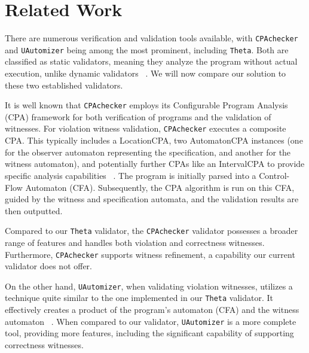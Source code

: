 \chapter{Related Work}

There are numerous verification and validation tools available, with \texttt{CPAchecker} and \texttt{UAutomizer}
being among the most prominent, including \texttt{Theta}. Both are classified as static validators, meaning
they analyze the program without actual execution, unlike dynamic validators ~\cite{witness1}. We will now compare
our solution to these two established validators.

It is well known that \texttt{CPAchecker} employs its Configurable Program Analysis (CPA) framework for
both verification of programs and the validation of witnesses. For violation witness validation, \texttt{CPAchecker}
executes a composite CPA. This typically includes a LocationCPA, two AutomatonCPA instances (one
for the observer automaton representing the specification, and another for the witness automaton),
and potentially further CPAs like an IntervalCPA to provide specific analysis capabilities ~\cite{witness1}.
The program is initially parsed into a Control-Flow Automaton (CFA). Subsequently, the CPA
algorithm is run on this CFA, guided by the witness and specification automata, and the
validation results are then outputted.

Compared to our \texttt{Theta} validator, the \texttt{CPAchecker} validator possesses a broader range of features
and handles both violation and correctness witnesses. Furthermore, \texttt{CPAchecker} supports witness
refinement, a capability our current validator does not offer.

On the other hand, \texttt{UAutomizer}, when validating violation witnesses, utilizes a technique quite
similar to the one implemented in our \texttt{Theta} validator. It effectively creates a product of the
program's automaton (CFA) and the witness automaton ~\cite{witness1}.
When compared to our validator, \texttt{UAutomizer} is a more complete tool, providing more features,
including the significant capability of supporting correctness witnesses.



%

